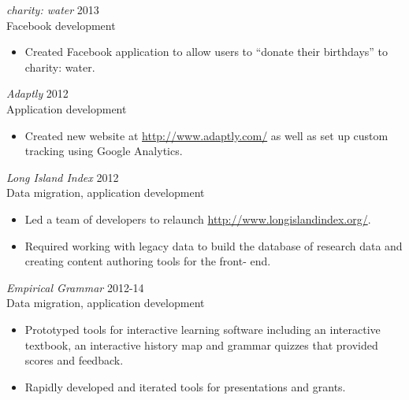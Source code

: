 \documentclass[line,margin]{res}
\begin{document}
\begin{resume}
\begin{itemize}
    \end{itemize}

    {\sl charity: water}
    \hfill 2013 \\
    Facebook development
    \begin{itemize} \itemsep -2pt
        \item
            Created Facebook application to allow users to ``donate their
            birthdays'' to charity: water.

    \end{itemize}

    {\sl Adaptly}
    \hfill 2012 \\
    Application development
    \begin{itemize} \itemsep -2pt
        \item
            Created new website at \url{http://www.adaptly.com/} as well as
            set up custom tracking using Google Analytics.

    \end{itemize}

    {\sl Long Island Index}
    \hfill 2012 \\
    Data migration, application development
    \begin{itemize} \itemsep -2pt
        \item
            Led a team of developers to relaunch
            \url{http://www.longislandindex.org/}.

        \item
            Required working with legacy data to build the database of
            research data and creating content authoring tools for the front-
            end.
    \end{itemize}

    \begin{samepage}
    {\sl Empirical Grammar}
    \hfill 2012-14 \\
    Data migration, application development
    \begin{itemize} \itemsep -2pt
        \item
            Prototyped tools for interactive learning software including an
            interactive textbook, an interactive history map and grammar
            quizzes that provided scores and feedback.

        \item
            Rapidly developed and iterated tools for presentations and grants.
    \end{itemize}
    \end{samepage}



\end{resume}
\end{document}
